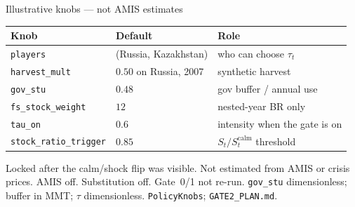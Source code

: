 \begin{frame}{Illustrative knobs --- not AMIS estimates}

{\scriptsize
\renewcommand{\arraystretch}{0.95}
\begin{center}
\begin{tabular}{@{}lll@{}}
\toprule
Knob & Default & Role \\
\midrule
\texttt{players} & (Russia, Kazakhstan) & who can choose $\tau_t$ \\
\texttt{harvest\_mult} & $0.50$ on Russia, 2007 & synthetic harvest \\
\texttt{gov\_stu} & $0.48$ & gov buffer / annual use \\
\texttt{fs\_stock\_weight} & $12$ & nested-year BR only \\
\texttt{tau\_on} & $0.6$ & intensity when the gate is on \\
\texttt{stock\_ratio\_trigger} & $0.85$ & $S_t/S^{\mathrm{calm}}_t$ threshold \\
\bottomrule
\end{tabular}
\end{center}}

{\scriptsize Locked after the calm/shock flip was visible. Not estimated
from AMIS or crisis prices. AMIS off. Substitution off. Gate~0/1 not re-run.}
{\texttt{gov\_stu} dimensionless; buffer in MMT; $\tau$ dimensionless.}
{\texttt{PolicyKnobs}; \texttt{GATE2\_PLAN.md}.}
\end{frame}

